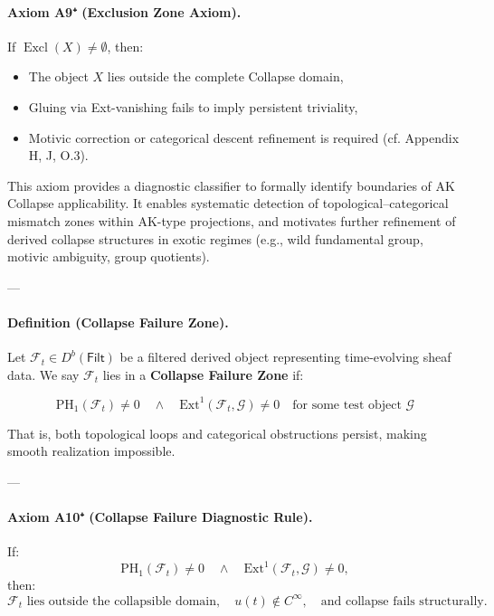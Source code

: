 \documentclass[11pt]{article}
\begin{document}
\begin{axiom}
\begin{axiom}
{{\paragraph{Axiom A9⁺ (Exclusion Zone Axiom).}
If \( \operatorname{Excl}(X) \neq \emptyset \), then:
\begin{itemize}
  \item The object \( X \) lies outside the complete Collapse domain,
  \item Gluing via Ext-vanishing fails to imply persistent triviality,
  \item Motivic correction or categorical descent refinement is required (cf. Appendix H, J, O.3).
\end{itemize}

This axiom provides a diagnostic classifier to formally identify boundaries of AK Collapse applicability.  
It enables systematic detection of topological–categorical mismatch zones within AK-type projections, and motivates further refinement of derived collapse structures in exotic regimes (e.g., wild fundamental group, motivic ambiguity, group quotients).

---

\paragraph{Definition (Collapse Failure Zone).}

Let \( \mathcal{F}_t \in D^b(\mathsf{Filt}) \) be a filtered derived object representing time-evolving sheaf data.  
We say \( \mathcal{F}_t \) lies in a \textbf{Collapse Failure Zone} if:

\[
\mathrm{PH}_1(\mathcal{F}_t) \ne 0 \quad \land \quad \mathrm{Ext}^1(\mathcal{F}_t, \mathcal{G}) \ne 0 \quad \text{for some test object } \mathcal{G}
\]

That is, both topological loops and categorical obstructions persist, making smooth realization impossible.

---

\paragraph{Axiom A10⁺ (Collapse Failure Diagnostic Rule).}

If:
\[
\mathrm{PH}_1(\mathcal{F}_t) \ne 0 \quad \land \quad \mathrm{Ext}^1(\mathcal{F}_t, \mathcal{G}) \ne 0,
\]
then:
\[
\mathcal{F}_t \text{ lies outside the collapsible domain}, \quad u(t) \notin C^\infty, \quad \text{and collapse fails structurally.}
\]

}}
\end{axiom}
\end{axiom}
\end{document}
